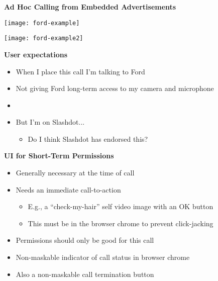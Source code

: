 \documentclass[helvetica]{seminar}
\newcommand{\heading}[1]{%
  \begin{center} 
    \large\bf 
    #1 
  \end{center} 
  \vspace{.4 in}}
\begin{document}
\begin{slide}
\heading{Ad Hoc Calling from Embedded Advertisements}

\vspace{-.3in}
\begin{minipage}[b]{1.8in}
\texttt{[image: ford-example]}
\end{minipage}
\begin{minipage}[b]{1.8in}
\texttt{[image: ford-example2]}
\end{minipage}
\end{slide}


\begin{slide}
\heading{User expectations}

\begin{itemize}
\item When I place this call I'm talking to Ford
\item Not giving Ford long-term access to my camera and microphone
\item[]
\item But I'm on Slashdot...
\begin{itemize}
\item Do I think Slashdot has endorsed this?
\end{itemize}
\end{itemize}
\end{slide}


\begin{slide}
\heading{UI for Short-Term Permissions}

\begin{itemize}
\item Generally necessary at the time of call
\item Needs an immediate call-to-action
\begin{itemize}
\item E.g., a ``check-my-hair'' self video image with an OK button
\item This must be in the browser chrome to prevent click-jacking
\end{itemize}
\item Permissions should only be good for this call
\item Non-maskable indicator of call status in browser chrome
\item Also a non-maskable call termination button
\end{itemize}


\end{slide}
\end{document}
